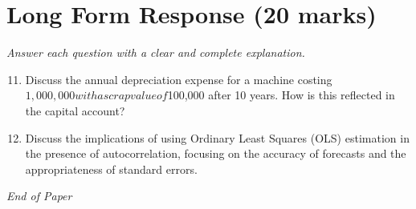 \documentclass[12pt]{article}
\begin{document}
\section*{Long Form Response (20 marks)}
\textit{Answer each question with a clear and complete explanation.}
\begin{enumerate}[label=\arabic*.]
\setcounter{enumi}{10}
\item Discuss the annual depreciation expense for a machine costing $1,000,000 with a scrap value of $100,000 after 10 years. How is this reflected in the capital account?
\item Discuss the implications of using Ordinary Least Squares (OLS) estimation in the presence of autocorrelation, focusing on the accuracy of forecasts and the appropriateness of standard errors.
\end{enumerate}

\vfill
\noindent\textit{End of Paper}
\end{document}
